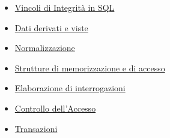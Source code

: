\documentclass[12pt, a4paper]{report}
\begin{document}
\begin{itemize}
        \item \href{https://2023.aulaweb.unige.it/pluginfile.php/352551/mod_book/chapter/829/sqllVincoli.pdf}{Vincoli di Integrità in SQL}
        \item \href{https://www.dropbox.com/scl/fi/cpqszf14jy3ng39nrkt64/sqllViste.pdf?rlkey=8zxyihsdlmvtcbb67dq762gqm&e=1&dl=0}{Dati derivati e viste}
        \item \href{https://2023.aulaweb.unige.it/pluginfile.php/352551/mod_book/chapter/835/normalizzazione.pdf}{Normalizzazione}
        \item \href{https://www.dropbox.com/scl/fi/68ovdsvcp11ojj2izgd6o/gestore%20delle%20strutture%20di%20memorizzazione%20e%20di%20accesso.pdf?rlkey=49iws799mhi21arnjyos2c51r&e=1&dl=0}{Strutture di memorizzazione e di accesso}
        \item \href{https://www.dropbox.com/scl/fi/1s8pjkfvv3qhw6n9vxgv6/elab-interrogazioni.pdf?rlkey=dnfz86cnhyz94hvxs4jmx23gz&e=1&dl=0}{Elaborazione di interrogazioni}
        \item \href{https://www.dropbox.com/scl/fi/wt3igo4wa8hfvoywlv8tm/controlloAccesso.pdf?rlkey=j4pfjg3mu7xundkmi6sbg3xvw&e=1&dl=0}{Controllo dell'Accesso}
        \item \href{https://www.dropbox.com/scl/fi/aqtxqxwpirdfxg9fpxtbs/transazioni.pdf?rlkey=xmjnie9k0ucfpz5xdhqbohyyi&e=1&dl=0}{Transazioni}
    \end{itemize}
    
\end{document}
